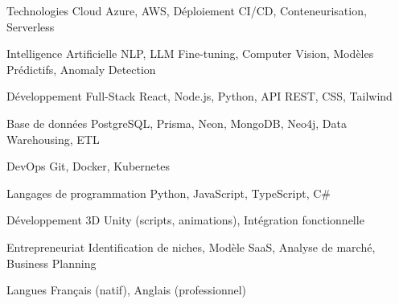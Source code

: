 


\begin{cvskills}


\cvskill
{Technologies Cloud} %
{Azure, AWS, Déploiement CI/CD, Conteneurisation, Serverless} %


\cvskill
{Intelligence Artificielle} %
{NLP, LLM Fine-tuning, Computer Vision, Modèles Prédictifs, Anomaly Detection} %


\cvskill
{Développement Full-Stack} %
{React, Node.js, Python, API REST, CSS, Tailwind} %


\cvskill
{Base de données} %
{PostgreSQL, Prisma, Neon, MongoDB, Neo4j, Data Warehousing, ETL} %


\cvskill
{DevOps} %
{Git, Docker, Kubernetes} %


\cvskill
{Langages de programmation} %
{Python, JavaScript, TypeScript, C\#} %


\cvskill
{Développement 3D} %
{Unity (scripts, animations), Intégration fonctionnelle} %


\cvskill
{Entrepreneuriat} %
{Identification de niches, Modèle SaaS, Analyse de marché, Business Planning} %


\cvskill
{Langues} %
{Français (natif), Anglais (professionnel)} %


\end{cvskills}
\vspace{1.5em}

